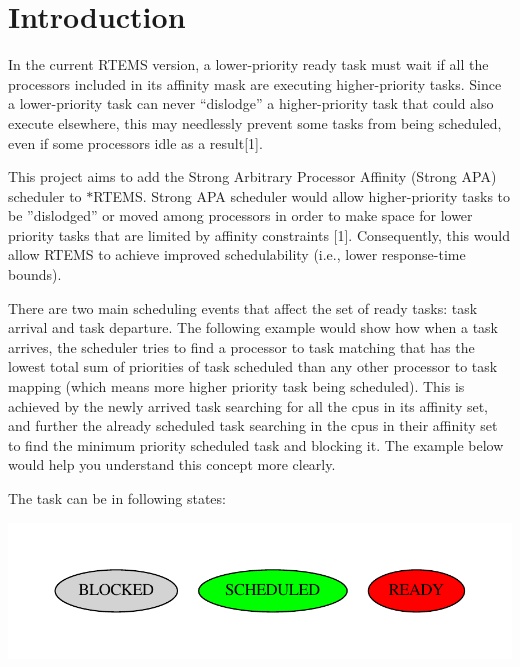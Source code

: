 \hypertarget{index_Introduction}{}\section{Introduction}\label{index_Introduction}
In the current R\+T\+E\+MS version, a lower-\/priority ready task must wait if all the processors included in its affinity mask are executing higher-\/priority tasks. Since a lower-\/priority task can never “dislodge” a higher-\/priority task that could also execute elsewhere, this may needlessly prevent some tasks from being scheduled, even if some processors idle as a result\mbox{[}1\mbox{]}.

This project aims to add the Strong Arbitrary Processor Affinity (Strong A\+PA) scheduler to $\ast$\+R\+T\+E\+MS. Strong A\+PA scheduler would allow higher-\/priority tasks to be ”dislodged” or moved among processors in order to make space for lower priority tasks that are limited by affinity constraints \mbox{[}1\mbox{]}. Consequently, this would allow R\+T\+E\+MS to achieve improved schedulability (i.\+e., lower response-\/time bounds).

There are two main scheduling events that affect the set of ready tasks\+: task arrival and task departure. The following example would show how when a task arrives, the scheduler tries to find a processor to task matching that has the lowest total sum of priorities of task scheduled than any other processor to task mapping (which means more higher priority task being scheduled). This is achieved by the newly arrived task searching for all the cpu\textquotesingle{}s in its affinity set, and further the already scheduled task searching in the cpu\textquotesingle{}s in their affinity set to find the minimum priority scheduled task and blocking it. The example below would help you understand this concept more clearly.

The task can be in following states\+:


\begin{DoxyImageNoCaption}
  \mbox{\includegraphics[width=\textwidth,height=\textheight/2,keepaspectratio=true]{dot_inline_dotgraph_1}}
\end{DoxyImageNoCaption}



